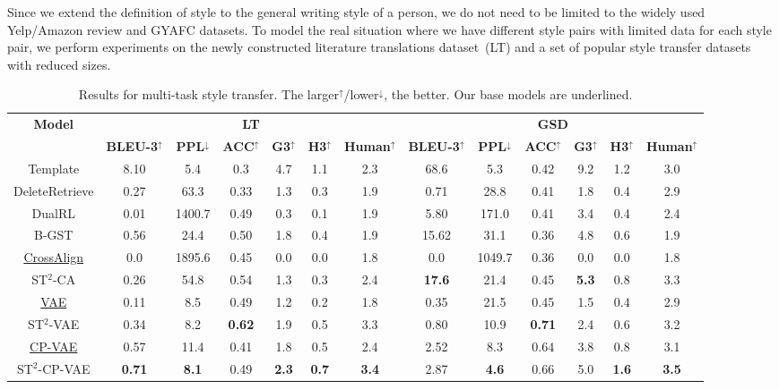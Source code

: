 Since we extend the definition of style to the general writing style of a person, we do not need to be limited to the widely used Yelp/Amazon review and GYAFC datasets. To model the real situation where we have different style pairs with limited data for each style pair, we perform experiments on the newly constructed literature translations dataset~(LT) and a set of popular style transfer datasets with reduced sizes.
\begin{table}[t]
	\footnotesize
	\centering
	\begin{tabular}{c|cccccc|cccccc}
		\hline
		\multirow{2}{*}{\textbf{Model}} & \multicolumn{6}{c|}{\textbf{LT}} & \multicolumn{6}{c}{\textbf{GSD}} \\
		\cline{2-13}
		& \textbf{BLEU-3}$^{\uparrow}$  & \textbf{PPL}$^\downarrow$ & \textbf{ACC}$^\uparrow$ &\textbf{G3}$^\uparrow$ &\textbf{H3}$^\uparrow$ & \textbf{Human}$^\uparrow$ & \textbf{BLEU-3}$^\uparrow$ & \textbf{PPL}$^\downarrow$ & \textbf{ACC}$^\uparrow$ &\textbf{G3}$^\uparrow$ &\textbf{H3}$^\uparrow$& \textbf{Human}$^\uparrow$ \\
		\hline
		Template & 8.10  & 5.4 & 0.3 & 4.7 &1.1 & 2.3 & 68.6 & 5.3 & 0.42 &9.2 &1.2 & 3.0 \\
		\hline

		DeleteRetrieve & 0.27 & 63.3 & 0.33 &1.3 &0.3 & 1.9 & 0.71  & 28.8 & 0.41 &1.8 &0.4 & 2.9 \\
		DualRL & 0.01 & 1400.7 & 0.49 &0.3 &0.1 & 1.9 & 5.80  & 171.0 & 0.41 &3.4 &0.4 & 2.4 \\

		B-GST & 0.56 & 24.4 &0.50  &1.8 &0.4 & 1.9  & 15.62  & 31.1 &0.36  &4.8 &0.6 & 1.9  \\

		\hline
		\underline{CrossAlign} & 0.0  & 1895.6 & 0.45 &0.0 &0.0 & 1.8 & 0.0  & 1049.7 & 0.36 &0.0 &0.0 & 1.8 \\
		ST$^2$-CA & 0.26 & 54.8 & 0.54 &1.3 &0.3 & 2.4 & \textbf{17.6} & 21.4 & 0.45 &\textbf{5.3} &0.8 & 3.3 
		\\
		\hline
		\underline{VAE} & 0.11  & 8.5 & 0.49 &1.2 &0.2 & 1.8 & 0.35 & 21.5 & 0.45 &1.5 &0.4 & 2.9 \\
		ST$^2$-VAE & 0.34  & 8.2 & \textbf{0.62} &1.9 &0.5 & 3.3 & 0.80 & 10.9 & \textbf{0.71} &2.4 &0.6 & 3.2 \\
		\hline
		\underline{CP-VAE} & 0.57 & 11.4 &0.41  &1.8 &0.5 & 2.4  & 2.52  & 8.3 &0.64  &3.8 &0.8 &3.1  \\
		ST$^2$-CP-VAE &\textbf{0.71}   &\textbf{8.1}  &0.49  &\textbf{2.3}  &\textbf{0.7} &\textbf{3.4}  &2.87  &\textbf{4.6}  &0.66  &5.0 &\textbf{1.6} &\textbf{3.5}  \\
		\hline
	\end{tabular}
	\caption{Results for multi-task style transfer. The larger$^\uparrow$/lower$^\downarrow$, the better. Our base models are underlined.}\label{tb:exp1}
\end{table}
